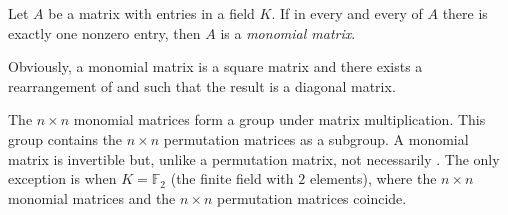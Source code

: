 \documentclass[12pt]{article}
\newcommand{\mbb}{\mathbb}
\begin{document}
Let $A$ be a matrix with entries in a field $K$. If in every  and every
 of $A$ there is exactly one nonzero entry, then $A$ is a
\emph{monomial matrix}.

Obviously, a monomial matrix is a square matrix and there exists a
rearrangement of  and  such that the result is a diagonal
matrix.

The $n\times n$ monomial matrices form a group under matrix
multiplication. This group contains the $n\times n$ permutation
matrices as a subgroup. A monomial matrix is invertible but, unlike a
permutation matrix, not necessarily . The only exception is
when $K=\mbb{F}_2$ (the finite field with $2$ elements), where the
$n\times n$ monomial matrices and the $n\times n$ permutation matrices
coincide.
\end{document}
